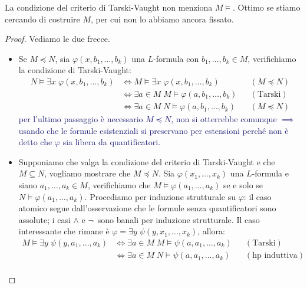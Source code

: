 \begin{note}
    La condizione del criterio di Tarski-Vaught non menziona $M \models$. Ottimo se stiamo cercando di costruire $M$, per cui non lo abbiamo ancora fissato.
\end{note}

\begin{proof}
    Vediamo le due frecce.
    \begin{itemize}
        \item[$\boxed{\implies}$] Se $M \preceq N$, sia $\varphi(x,b_1,\ldots,b_k)$ una $L$-formula con $b_1, \ldots, b_k \in M$, verifichiamo la condizione di Tarski-Vaught:
        \begin{align*}
            N \models \exists x \; \varphi(x,b_1,\ldots,b_k) &\iff M \models \exists x \; \varphi(x,b_1,\ldots,b_k) &&(M \preceq N) \\
                                                             &\iff \exists a \in M \; M \models \varphi(a,b_1,\ldots,b_k) &&(\text{Tarski}) \\
                                                             &\iff \exists a \in M \; N \models \varphi(a,b_1,\ldots,b_k) &&(M \preceq N)
        \end{align*}
        \textcolor{MidnightBlue}{per l'ultimo passaggio è necessario $M \preceq N$, non si otterrebbe comunque $\implies$ usando che le formule esistenziali si preservano per estensioni perché non è detto che $\varphi$ sia libera da quantificatori.} 
        \item[$\boxed{\impliedby}$] Supponiamo che valga la condizione del criterio di Tarski-Vaught e che $M \subseteq N$, vogliamo mostrare che $M \preceq N$. Sia $\varphi(x_1,\ldots,x_k)$ una $L$-formula e siano $a_1, \ldots, a_k \in M$, verifichiamo che $M \models \varphi(a_1,\ldots,a_k)$ se e solo se $N \models \varphi(a_1,\ldots,a_k)$.
        Procediamo per induzione strutturale su $\varphi$: il caso atomico segue dall'osservazione che le formule senza quantificatori sono assolute; i casi $\land$ e $\neg\,$ sono banali per induzione strutturale.
        Il caso interessante che rimane è $\varphi = \exists y \; \psi(y,x_1,\ldots,x_k)$, allora:
        \begin{align*}
            M \models \exists y \; \psi(y,a_1,\ldots,a_k) &\iff \exists a \in M \; M \models \psi(a,a_1,\ldots,a_k) &&(\text{Tarski}) \\
                                                          &\iff \exists a \in M \; N \models \psi(a,a_1,\ldots,a_k) &&(\text{hp induttiva}) \\

\end{align*}
\end{itemize}
\end{proof}
